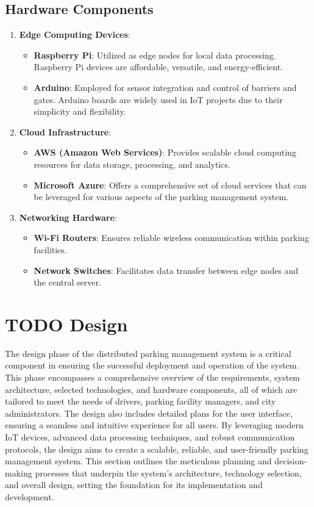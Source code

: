 \documentclass[oneside, 12pt, a4paper, draft]{book}
\begin{document}
\section{Hardware Components}
\label{sec:org5424040}
\begin{enumerate}
\item \textbf{\textbf{Edge Computing Devices}}:
\begin{itemize}
\item \textbf{\textbf{Raspberry Pi}}: Utilized as edge nodes for local data processing. Raspberry Pi devices are affordable, versatile, and energy-efficient.
\item \textbf{\textbf{Arduino}}: Employed for sensor integration and control of barriers and gates. Arduino boards are widely used in IoT projects due to their simplicity and flexibility.
\end{itemize}

\item \textbf{\textbf{Cloud Infrastructure}}:
\begin{itemize}
\item \textbf{\textbf{AWS (Amazon Web Services)}}: Provides scalable cloud computing resources for data storage, processing, and analytics.
\item \textbf{\textbf{Microsoft Azure}}: Offers a comprehensive set of cloud services that can be leveraged for various aspects of the parking management system.
\end{itemize}

\item \textbf{\textbf{Networking Hardware}}:
\begin{itemize}
\item \textbf{\textbf{Wi-Fi Routers}}: Ensures reliable wireless communication within parking facilities.
\item \textbf{\textbf{Network Switches}}: Facilitates data transfer between edge nodes and the central server.
\end{itemize}
\end{enumerate}
\chapter{{\bfseries\sffamily TODO} Design}
\label{sec:orgd0226cc}
The design phase of the distributed parking management system is a critical component in ensuring the successful deployment and operation of the system. This phase encompasses a comprehensive overview of the requirements, system architecture, selected technologies, and hardware components, all of which are tailored to meet the needs of drivers, parking facility managers, and city administrators. The design also includes detailed plans for the user interface, ensuring a seamless and intuitive experience for all users. By leveraging modern IoT devices, advanced data processing techniques, and robust communication protocols, the design aims to create a scalable, reliable, and user-friendly parking management system. This section outlines the meticulous planning and decision-making processes that underpin the system's architecture, technology selection, and overall design, setting the foundation for its implementation and development.
\end{document}
